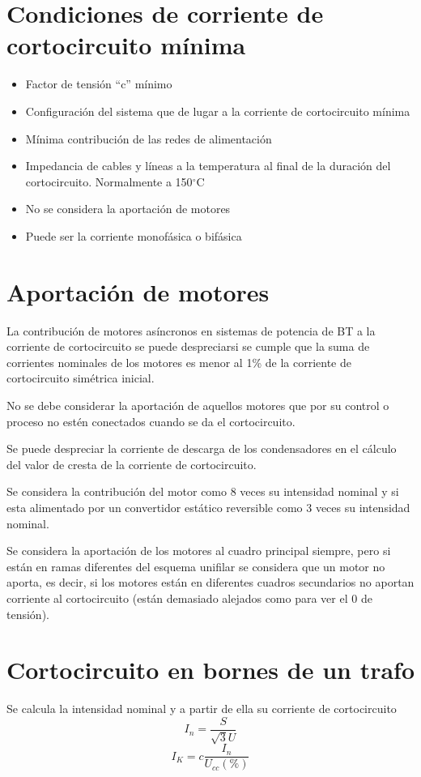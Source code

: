 \section{Condiciones de corriente de cortocircuito mínima}
\begin{itemize}
	\item Factor de tensión “c” mínimo
	\item Configuración del sistema que de lugar a la corriente de cortocircuito mínima
	\item Mínima contribución de las redes de alimentación
	\item Impedancia de cables y líneas a la temperatura al final de la duración del cortocircuito. Normalmente a 150$^\circ$C
	\item No se considera la aportación de motores
	\item Puede ser la corriente monofásica o bifásica
\end{itemize}
\section{Aportación de motores}
La contribución de motores asíncronos en sistemas de potencia de BT a la corriente de cortocircuito se puede despreciarsi se cumple que la suma de corrientes nominales de los motores es menor al 1\% de la corriente de cortocircuito simétrica inicial.
\newline

No se debe considerar la aportación de aquellos motores que por su control o proceso no estén conectados cuando se da el cortocircuito. 
\newline

Se puede despreciar la corriente de descarga de los condensadores en el cálculo del valor de cresta de la corriente de cortocircuito.
\newline

Se considera la contribución del motor como 8 veces su intensidad nominal y si esta alimentado por un convertidor estático reversible como 3 veces su intensidad nominal. 
\newline

Se considera la aportación de los motores al cuadro principal siempre, pero si están en ramas diferentes del esquema unifilar se considera que un motor no aporta, es decir, si los motores están en diferentes cuadros secundarios no aportan corriente al cortocircuito (están demasiado alejados como para ver el 0 de tensión).
\section{Cortocircuito en bornes de un trafo}
Se calcula la intensidad nominal y a partir de ella su corriente de cortocircuito
\begin{equation}
	I_n=\dfrac{S}{\sqrt{3}U}
\end{equation}
\begin{equation}
	I_K=c	\dfrac{I_n}{U_{cc}(\%)}
\end{equation}
